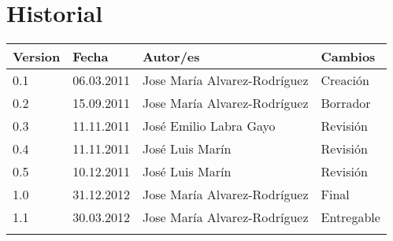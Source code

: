 \chapter*{Historial}
\thispagestyle{empty}

\begin{tabular}{|p{1.3cm}|p{3cm}|p{5cm}|p{5cm}|}  \hline
Version & Fecha & Autor/es & Cambios \\ \hline \hline

0.1 & 06.03.2011 & Jose María Alvarez-Rodríguez & Creación  \\
0.2 & 15.09.2011 & Jose María Alvarez-Rodríguez& Borrador \\
0.3 & 11.11.2011 & José Emilio Labra Gayo & Revisión \\
0.4 & 11.11.2011 & José Luis Marín & Revisión \\
0.5 & 10.12.2011 & José Luis Marín & Revisión \\
1.0 & 31.12.2012 & Jose María Alvarez-Rodríguez & Final \\
1.1 & 30.03.2012 & Jose María Alvarez-Rodríguez & Entregable \\
 &  &  & \\ \hline

\hline
\end{tabular}
